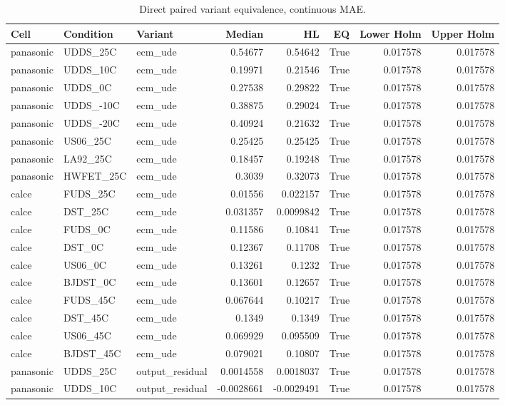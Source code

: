 \begin{table}[!t]
\centering
\footnotesize
\caption{Direct paired variant equivalence, continuous MAE.}
\label{tab:reviewer-comparison-1}
\setlength{\tabcolsep}{3pt}
\begin{tabular}{ll p{} rrr rr}
\toprule
Cell & Condition & Variant & Median & HL & EQ & Lower Holm & Upper Holm \\
\midrule
panasonic & UDDS\_25C & ecm\_ude & 0.54677 & 0.54642 & True & 0.017578 & 0.017578 \\
panasonic & UDDS\_10C & ecm\_ude & 0.19971 & 0.21546 & True & 0.017578 & 0.017578 \\
panasonic & UDDS\_0C & ecm\_ude & 0.27538 & 0.29822 & True & 0.017578 & 0.017578 \\
panasonic & UDDS\_-10C & ecm\_ude & 0.38875 & 0.29024 & True & 0.017578 & 0.017578 \\
panasonic & UDDS\_-20C & ecm\_ude & 0.40924 & 0.21632 & True & 0.017578 & 0.017578 \\
panasonic & US06\_25C & ecm\_ude & 0.25425 & 0.25425 & True & 0.017578 & 0.017578 \\
panasonic & LA92\_25C & ecm\_ude & 0.18457 & 0.19248 & True & 0.017578 & 0.017578 \\
panasonic & HWFET\_25C & ecm\_ude & 0.3039 & 0.32073 & True & 0.017578 & 0.017578 \\
calce & FUDS\_25C & ecm\_ude & 0.01556 & 0.022157 & True & 0.017578 & 0.017578 \\
calce & DST\_25C & ecm\_ude & 0.031357 & 0.0099842 & True & 0.017578 & 0.017578 \\
calce & FUDS\_0C & ecm\_ude & 0.11586 & 0.10841 & True & 0.017578 & 0.017578 \\
calce & DST\_0C & ecm\_ude & 0.12367 & 0.11708 & True & 0.017578 & 0.017578 \\
calce & US06\_0C & ecm\_ude & 0.13261 & 0.1232 & True & 0.017578 & 0.017578 \\
calce & BJDST\_0C & ecm\_ude & 0.13601 & 0.12657 & True & 0.017578 & 0.017578 \\
calce & FUDS\_45C & ecm\_ude & 0.067644 & 0.10217 & True & 0.017578 & 0.017578 \\
calce & DST\_45C & ecm\_ude & 0.1349 & 0.1349 & True & 0.017578 & 0.017578 \\
calce & US06\_45C & ecm\_ude & 0.069929 & 0.095509 & True & 0.017578 & 0.017578 \\
calce & BJDST\_45C & ecm\_ude & 0.079021 & 0.10807 & True & 0.017578 & 0.017578 \\
panasonic & UDDS\_25C & output\_residual & 0.0014558 & 0.0018037 & True & 0.017578 & 0.017578 \\
panasonic & UDDS\_10C & output\_residual & -0.0028661 & -0.0029491 & True & 0.017578 & 0.017578 \\
\bottomrule
\end{tabular}
\end{table}

